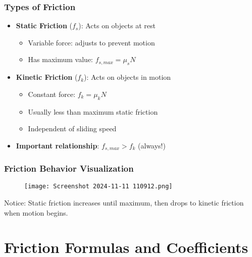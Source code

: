 \documentclass{beamer}
\begin{document}
\begin{frame}
\frametitle{Types of Friction}
\begin{itemize}
    \item \textbf{Static Friction} ($f_s$): Acts on objects at rest
    \begin{itemize}
        \item Variable force: adjusts to prevent motion
        \item Has maximum value: $f_{s,max} = \mu_s N$
    \end{itemize}
    \pause
    
    \vspace{0.5em}
    \item \textbf{Kinetic Friction} ($f_k$): Acts on objects in motion
    \begin{itemize}
        \item Constant force: $f_k = \mu_k N$
        \item Usually less than maximum static friction
        \item Independent of sliding speed
    \end{itemize}
    \pause
    
    \vspace{0.5em}
    \item \textbf{Important relationship}: $f_{s,max} > f_k$ (always!)
\end{itemize}
\end{frame}

\begin{frame}
\frametitle{Friction Behavior Visualization}
\begin{figure}[H]
    \centering
    \texttt{[image: Screenshot 2024-11-11 110912.png]}
\end{figure}

Notice: Static friction increases until maximum, then drops to kinetic friction when motion begins.
\end{frame}

\section{Friction Formulas and Coefficients}
\end{document}
